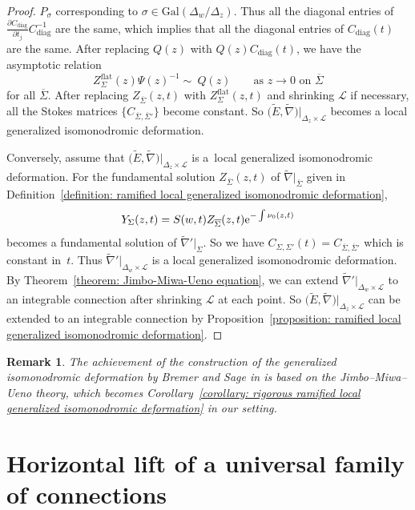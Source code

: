 \documentclass[pdftex]{sigma}
\numberwithin{equation}{section}
\newtheorem{Remark}[Theorem]{Remark}
\begin{document}
\begin{proof}
$P_{\sigma}$ corresponding to $\sigma\in \mathrm{Gal}(\Delta_w/\Delta_z)$.
Thus all the diagonal entries of
$\frac {\partial C_{\mathrm{diag}}} {\partial t_j}
C_{\mathrm{diag}}^{-1}$
are the same,
which implies that all the diagonal entries of $C_{\mathrm{diag}}(t)$ are the same.
After replacing $Q(z)$ with $Q(z) C_{\mathrm{diag}}(t)$,
we have the asymptotic relation
 \[
 Z^{\mathrm{flat}}_{\Sigma}(z)
 \Psi(z)^{-1}
 \sim \ Q(z)
 \qquad
 \text{as $z\to 0$ on $\overline{\Sigma}$}
\]
for all $\overline{\Sigma}$.
After replacing
$Z_{\overline{\Sigma}}(z,t)$ with
$Z^{\mathrm{flat}}_{\Sigma}(z,t)$
and shrinking ${\mathcal L}$ if necessary,
all the Stokes matrices
$\big\{ C_{\overline{\Sigma},\overline{\Sigma}'} \big\}$
become constant.
So $\big(\tilde{E},\tilde{\nabla}\big)|_{\Delta_z\times {\mathcal L}}$
becomes a local generalized isomonodromic deformation.

Conversely, assume that $\big(\tilde{E},\tilde{\nabla}\big)|_{\Delta_z\times {\mathcal L}}$
is a~local generalized isomonodromic deformation.
For the fundamental solution
$Z_{\overline{\Sigma}}(z,t)$ of $\tilde{\nabla}|_{\overline{\Sigma}}$
given in Definition~\ref{definition: ramified local generalized isomonodromic deformation},
\[
 Y_{\Sigma}(z,t)=S(w,t)Z_{\overline{\Sigma}}(z,t){\rm e}^{-\int \nu_0(z,t)}
\]
becomes a fundamental solution of
$\tilde{\nabla}'|_{\Sigma}$.
So we have
$C_{\Sigma,\Sigma'}(t)=C_{\overline{\Sigma},\overline{\Sigma}'}$
which is constant in~$t$.
Thus
$\tilde{\nabla}'|_{\Delta_w\times{\mathcal L}}$ is a local generalized isomonodromic deformation.
By Theorem~\ref{theorem: Jimbo-Miwa-Ueno equation},
we can extend $\tilde{\nabla}'|_{\Delta_w\times{\mathcal L}}$
to an integrable connection after shrinking ${\mathcal L}$ at each point.
So $\big(\tilde{E},\tilde{\nabla}\big)|_{\Delta_z\times {\mathcal L}}$
can be extended to an integrable connection by
Proposition~\ref{proposition: ramified local generalized isomonodromic deformation}.
\end{proof}

\begin{Remark}The achievement of the construction of the generalized isomonodromic deformation
by Bremer and Sage in \cite{Bremer-Sage-2} is based on
the Jimbo--Miwa--Ueno theory, which becomes
Corollary~\ref{corollary: rigorous ramified local generalized isomonodromic deformation}
in our setting.
\end{Remark}

\section {Horizontal lift of a universal family of connections}\label{section: horizontal lift}
\end{document}
